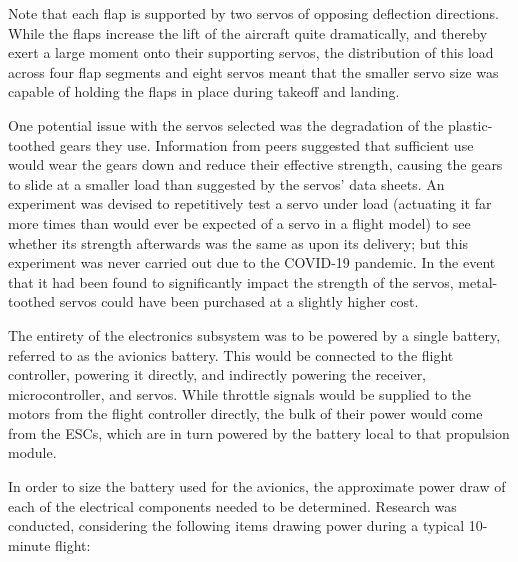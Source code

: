 \documentclass[../../main.tex]{subfiles}
\begin{document}

Note that each flap is supported by two servos of opposing deflection directions.
While the flaps increase the lift of the aircraft quite dramatically, and thereby exert a large moment onto their supporting servos, the distribution of this load across four flap segments and eight servos meant that the smaller servo size was capable of holding the flaps in place during takeoff and landing. 

One potential issue with the servos selected was the degradation of the plastic-toothed gears they use.
Information from peers suggested that sufficient use would wear the gears down and reduce their effective strength, causing the gears to slide at a smaller load than suggested by the servos’ data sheets.
An experiment was devised to repetitively test a servo under load (actuating it far more times than would ever be expected of a servo in a flight model) to see whether its strength afterwards was the same as upon its delivery; but this experiment was never carried out due to the COVID-19 pandemic.
In the event that it had been found to significantly impact the strength of the servos, metal-toothed servos could have been purchased at a slightly higher cost. 

The entirety of the electronics subsystem was to be powered by a single battery, referred to as the avionics battery.
This would be connected to the flight controller, powering it directly, and indirectly powering the receiver, microcontroller, and servos.
While throttle signals would be supplied to the motors from the flight controller directly, the bulk of their power would come from the ESCs, which are in turn powered by the battery local to that propulsion module. 

In order to size the battery used for the avionics, the approximate power draw of each of the electrical components needed to be determined.
Research was conducted, considering the following items drawing power during a typical 10-minute flight: 
\end{document}
